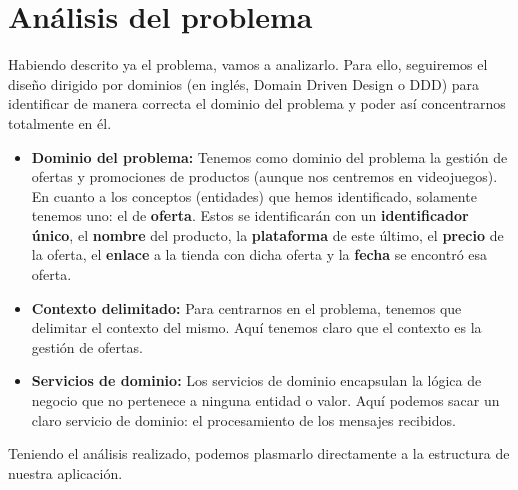 \chapter{Análisis del problema}
 
Habiendo descrito ya el problema, vamos a analizarlo. Para ello, seguiremos el 
diseño dirigido por dominios (en inglés, Domain Driven Design o DDD) \cite{ddd} 
para identificar de manera correcta el dominio del problema y poder así 
concentrarnos totalmente en él.

\begin{itemize}
    \item \textbf{Dominio del problema:} Tenemos como dominio del problema la 
    gestión de ofertas y promociones de productos (aunque nos centremos en 
    videojuegos). En cuanto a los conceptos (entidades) que hemos identificado, 
    solamente tenemos uno: el de \textbf{oferta}. Estos se identificarán con un 
    \textbf{identificador único}, el \textbf{nombre} del producto, la 
    \textbf{plataforma} de este último, el \textbf{precio} de la oferta, el 
    \textbf{enlace} a la tienda con dicha oferta y la \textbf{fecha} se encontró 
    esa oferta.
    \item \textbf{Contexto delimitado:} Para centrarnos en el problema, tenemos que 
    delimitar el contexto del mismo. Aquí tenemos claro que el contexto es la 
    gestión de ofertas.
    \item \textbf{Servicios de dominio:} Los servicios de dominio encapsulan la 
    lógica de negocio que no pertenece a ninguna entidad o valor. Aquí podemos sacar 
    un claro servicio de dominio: el procesamiento de los mensajes recibidos.
\end{itemize}

Teniendo el análisis realizado, podemos plasmarlo directamente a la estructura de 
nuestra aplicación.
